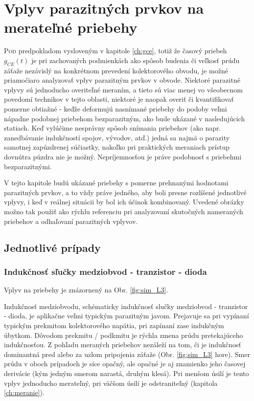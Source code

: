 \chapter{Vplyv parazitných prvkov na merateľné priebehy} \label{ch:parazity}

\lettrine{P}{od} predpokladom vysloveným v kapitole \ref{ch:gce}, totiž že časový priebeh $g_{CE}(t)$ je pri zachovaných podmienkách ako spôsob budenia či veľkosť prúdu záťaže nezávislý na konkrétnom prevedení kolektorového obvodu, je možné priamočiaro analyzovať vplyv parazitným prvkov v obvode.
Niektoré parazitné vplyvy sú jednoducho overiteľné meraním, a tieto sú viac menej vo všeobecnom povedomí technikov v tejto oblasti, niektoré je naopak overiť či kvantifikovať pomerne obtiažné - keďže deformujú nasnímané priebehy do podoby veľmi nápadne podobnej priebehom bezparazitným, ako bude ukázané v nasledujúcich statiach. Keď vylúčime nesprávny spôsob snímania priebehov (ako napr. zanedbávanie indukčností spojov, vývodov, atď.) jedná sa najmä o parazity samotnej zapúzdrenej súčiastky, nakoľko pri praktických meraniach prístup dovnútra púzdra nie je možný. Nepríjemnosťou je práve podobnosť s priebehmi bezparazitnými.

V tejto kapitole budú ukázané priebehy s pomerne prehnanými hodnotami parazitných prvkov, a to vždy práve jedného, aby boli presne rozlíšené jednotlivé vplyvy, i keď v reálnej situácii by bol ich účinok kombinovaný. Uvedené obrázky možno tak použiť ako rýchlu referenciu pri analyzovaní skutočných nameraných priebehov a odhaľovaní parazitných vplyvov.


\section{Jednotlivé prípady}


\subsection{Indukčnosť sľučky medziobvod - tranzistor - dioda}
Vplyv na priebehy je znázornený na Obr. \ref{fig:sim_L3}.

Indukčnosť medziobvodu, schématicky indukčnosť slučky medziobvod - tranzistor - dioda, je aplikačne veľmi typickým parazitným javom. Prejavuje sa pri vypínaní typickým prekmitom kolektorového napätia, pri zapínaní zase indukčným úbytkom. Dôvodom prekmitu / podkmitu je rýchla zmena prúdu pretekajúceho indukčnosťou. Z pohľadu meraných priebehov nezáleží na tom, či je indukčnosť dominantná pred alebo za uzlom pripojenia záťaže (Obr. \ref{fig:sim_L3} hore). Smer prúdu v oboch prípadoch je síce opačný, ale opačné je aj znamienko jeho časovej derivácie (kým jedným smerom narastá, druhým klesá).
Pri menšom úsilí je tento vplyv jednoducho merateľný, pri väčšom úsilí je odstraniteľný (kapitola \ref{ch:meranie}).


